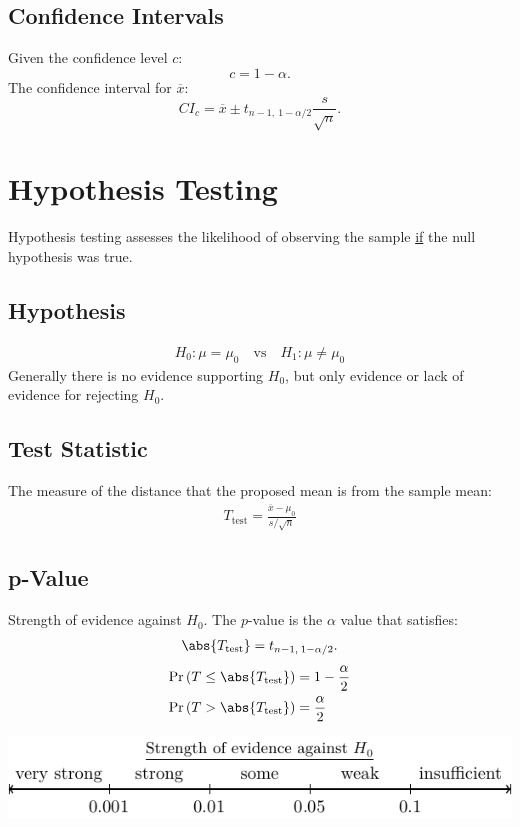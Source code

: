 \documentclass{article}
\begin{document}
\begin{minipage}{126.1962963mm}
    \begin{multicols*}{2}
        \subsection*{Confidence Intervals}
        Given the confidence level \(c\):
        \begin{equation*}
            c = 1 - \alpha.
        \end{equation*}
        The confidence interval for \(\overline{x}\):
        \begin{equation*}
            {CI}_{c} = \overline{x} \pm t_{n-1,\: 1-\alpha/2} \frac{s}{\sqrt{n}}.
        \end{equation*}
        \section*{Hypothesis Testing}
        Hypothesis testing assesses the likelihood of observing the sample \underline{if} the null hypothesis was true.
        \subsection*{Hypothesis}
        \begin{align*}
            H_0:\mu = \mu_0 \quad \text{vs} \quad H_1:\mu \neq \mu_0
        \end{align*}
        Generally there is no evidence supporting \(H_0\), but only evidence or lack of evidence for rejecting \(H_0\).
        \subsection*{Test Statistic}
        The measure of the distance that the proposed mean is from the sample mean:
        \begin{align*}
            T_{\text{test}} = \frac{\overline{x} - \mu_0}{s/\sqrt{n}}
        \end{align*}
        \subsection*{p-Value}
        Strength of evidence against \(H_0\). The \(p\)-value is the \(\alpha\) value that satisfies:
        \begin{equation*}
            \abs{T_{\text{test}}} = t_{n-1,\: 1-\alpha/2}.
        \end{equation*}
        \begin{align*}
            \Pr{\left( T \leq \abs{T_{\text{test}}} \right)} & = 1 - \frac{\alpha}{2} \\
            \Pr{\left( T > \abs{T_{\text{test}}} \right)}    & = \frac{\alpha}{2}
        \end{align*}
    \end{multicols*}
    \includegraphics[width = \linewidth, keepaspectratio = true]{figures/p_values.pdf}
\end{minipage}
\end{document}

